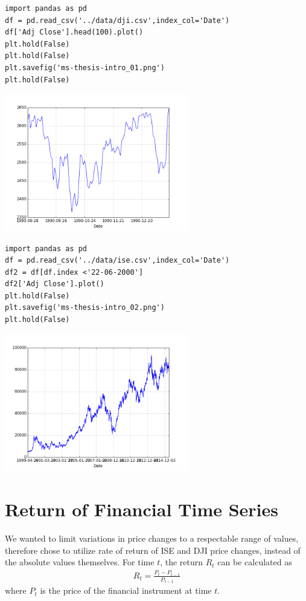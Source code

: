\begin{verbatim}
import pandas as pd
df = pd.read_csv('../data/dji.csv',index_col='Date')
df['Adj Close'].head(100).plot()
plt.hold(False)
plt.hold(False)
plt.savefig('ms-thesis-intro_01.png')
plt.hold(False)
\end{verbatim}

\includegraphics[height=6cm]{ms-thesis-intro_01.png}

\begin{verbatim}
import pandas as pd
df = pd.read_csv('../data/ise.csv',index_col='Date')
df2 = df[df.index <'22-06-2000']
df2['Adj Close'].plot()
plt.hold(False)
plt.savefig('ms-thesis-intro_02.png')
plt.hold(False)
\end{verbatim}

\includegraphics[height=6cm]{ms-thesis-intro_02.png}


\section{Return of Financial Time Series}

We wanted to limit variations in price changes to a respectable range of values,
therefore chose to utilize rate of return of ISE and DJI price changes, instead
of the absolute values themselves. For time $t$, the return $R_t$ can be
calculated as
\begin{eqnarray*}
R_t = \frac{P_t - P_{t-1}}{P_{t-1}}
\end{eqnarray*}
where $P_t$ is the price of the financial instrument at time $t$. 

